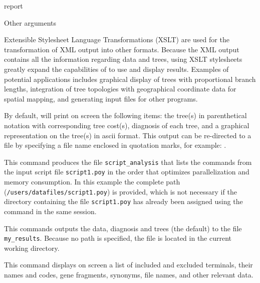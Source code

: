 \begin{command}{report}{}
\begin{arguments}
\begin{argumentgroup}{Other arguments}
            \begin{statement}
                Extensible Stylesheet Language Transformations (XSLT) are used
                for the transformation of XML output into other formats. Because the XML 
                output contains all the information regarding data and trees, using XSLT 
                stylesheets greatly expand the capabilities of \poy to use and display results.
                Examples of potential applications includes graphical display of trees with 
                proportional branch lengths, integration of tree topologies with geographical 
                coordinate data for spatial mapping, and generating input files for other programs.
            \end{statement}
     
        \end{argumentgroup}
    \end{arguments}

        {By default, \poy will print on screen the following items: the tree(s)
        in parenthetical notation with corresponding tree cost(s), diagnosis of
        each tree, and a graphical representation on the tree(s) in ascii
        format. This output can be re-directed to a file by specifying a file
        name enclosed in quotation marks, for example: .}

    \begin{poyexamples} 

            {This command produces the file \texttt{script\_analysis} that lists the commands from
            the input script file \texttt{script1.poy} in the order that optimizes parallelization and
            memory consumption. In this example the complete path (\texttt{/users/datafiles/script1.poy})
            is provided, which is not necessary if the directory containing the file \texttt{script1.poy}
            has already been assigned using the command  in the same \poy session.}
      
            {This commands outputs the data, diagnosis and trees (the default) to the
            file \texttt{my\_results}. Because no path is specified, the
            file is located in the current working directory.}
    
            {This command displays on screen a list of included and excluded terminals, their
            names and codes, gene fragments, synonyms, file names, and other relevant data.}
        

\end{poyexamples}
\end{command}
